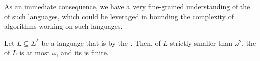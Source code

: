 As an immediate consequence, we have a very fine-grained understanding of the
 of such  languages, which could be
leveraged in bounding the complexity of algorithms working on such languages.

\begin{corollary}
    \label{prefixes-ordinal-invariants:cor}
    Let $L \subseteq \Sigma^*$ be a language that is
     by the . Then,
     of $L$ strictly smaller than $\omega^2$,
    the  of $L$ is at most $\omega$, and
    its  is finite.
\end{corollary}
